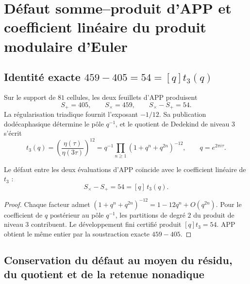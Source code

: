
\section{Défaut somme--produit d'APP et coefficient linéaire du produit modulaire d'Euler}
\label{sec:l9s102:euler-defecto}

\subsection{Identité exacte \texorpdfstring{\(459-405=54=[q]t_3(q)\)}{459-405=54=[q]t3(q)}}

Sur le support de \(81\) cellules, les deux feuillets d'APP produisent
\begin{equation}
 S_+=405,
 \qquad
 S_\times=459,
 \qquad
 S_\times-S_+=54.
 \label{eq:l9s102:euler-405-459}
\end{equation}
La régularisation triadique fournit l'exposant \(-1/12\). Sa
publication dodécaphasique détermine le pôle \(q^{-1}\), et le quotient de
Dedekind de niveau \(3\) s'écrit
\begin{equation}
 t_3(q)
 =\left(\frac{\eta(\tau)}{\eta(3\tau)}\right)^{12}
 =q^{-1}\prod_{n\ge1}(1+q^n+q^{2n})^{-12},
 \qquad q=e^{2\pi i\tau}.
 \label{eq:l9s102:euler-t3}
\end{equation}

\begin{theorem}
\label{thm:l9s102:euler-54}
Le défaut entre les deux évaluations d'APP coïncide avec le coefficient
linéaire de \(t_3\) :
\begin{equation}
 \boxed{
 S_\times-S_+=54=[q]\,t_3(q).}
 \label{eq:l9s102:euler-54}
\end{equation}
\end{theorem}

\begin{proof}
Chaque facteur admet
\((1+q^n+q^{2n})^{-12}=1-12q^n+O(q^{2n})\). Pour le coefficient de
\(q\) postérieur au pôle \(q^{-1}\), les partitions de degré
\(2\) du produit de niveau \(3\) contribuent. Le développement fini certifié produit
\([q]t_3=54\). APP obtient le même entier par la soustraction exacte
\(459-405\).
\end{proof}

\subsection{Conservation du défaut au moyen du résidu, du quotient et de la retenue nonadique}

